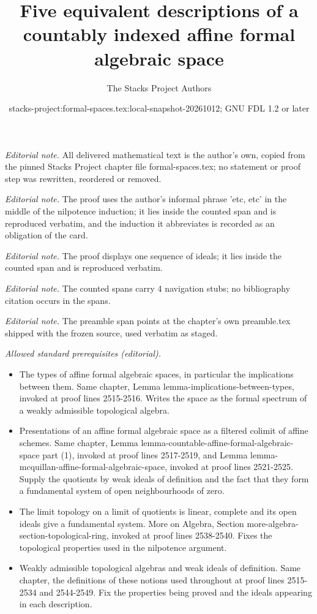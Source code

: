 \documentclass{stacks-project}
\title{Five equivalent descriptions of a countably indexed affine formal algebraic space}
\author{The Stacks Project Authors}
\date{stacks-project:formal-spaces.tex:local-snapshot-20261012; GNU FDL 1.2 or later}
\theoremstyle{plain}
\theoremstyle{definition}
\theoremstyle{remark}
\numberwithin{equation}{subsection}
\begin{document}
\maketitle
\noindent\textit{Editorial note.} All delivered mathematical text is the author's own, copied from the pinned Stacks Project chapter file formal-spaces.tex; no statement or proof step was rewritten, reordered or removed.\par\medskip
\noindent\textit{Editorial note.} The proof uses the author's informal phrase 'etc, etc' in the middle of the nilpotence induction; it lies inside the counted span and is reproduced verbatim, and the induction it abbreviates is recorded as an obligation of the card.\par\medskip
\noindent\textit{Editorial note.} The proof displays one sequence of ideals; it lies inside the counted span and is reproduced verbatim.\par\medskip
\noindent\textit{Editorial note.} The counted spans carry 4 navigation stubs; no bibliography citation occurs in the spans.\par\medskip
\noindent\textit{Editorial note.} The preamble span points at the chapter's own preamble.tex shipped with the frozen source, used verbatim as staged.\par\medskip
\noindent\textit{Allowed standard prerequisites (editorial).}\begin{itemize}
\item The types of affine formal algebraic spaces, in particular the implications between them. Same chapter, Lemma lemma-implications-between-types, invoked at proof lines 2515-2516. Writes the space as the formal spectrum of a weakly admissible topological algebra.
\item Presentations of an affine formal algebraic space as a filtered colimit of affine schemes. Same chapter, Lemma lemma-countable-affine-formal-algebraic-space part (1), invoked at proof lines 2517-2519, and Lemma lemma-mcquillan-affine-formal-algebraic-space, invoked at proof lines 2521-2525. Supply the quotients by weak ideals of definition and the fact that they form a fundamental system of open neighbourhoods of zero.
\item The limit topology on a limit of quotients is linear, complete and its open ideals give a fundamental system. More on Algebra, Section more-algebra-section-topological-ring, invoked at proof lines 2538-2540. Fixes the topological properties used in the nilpotence argument.
\item Weakly admissible topological algebras and weak ideals of definition. Same chapter, the definitions of these notions used throughout at proof lines 2515-2534 and 2544-2549. Fix the properties being proved and the ideals appearing in each description.
\end{itemize}\medskip
\end{document}
